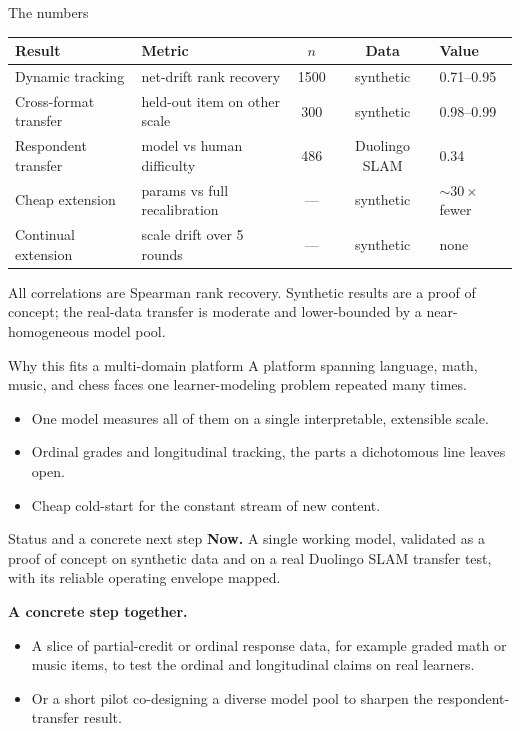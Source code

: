 \documentclass[aspectratio=169]{beamer}
\begin{document}
\begin{frame}{The numbers}
  \centering\small
  \begin{tabular}{llccl}
    \toprule
    Result & Metric & $n$ & Data & Value \\
    \midrule
    Dynamic tracking      & net-drift rank recovery       & 1500 & synthetic       & 0.71--0.95 \\
    Cross-format transfer & held-out item on other scale  & 300  & synthetic       & 0.98--0.99 \\
    Respondent transfer   & model vs human difficulty     & 486  & Duolingo SLAM   & 0.34 \\
    Cheap extension      & params vs full recalibration & ---  & synthetic       & $\sim 30\times$ fewer \\
    Continual extension  & scale drift over 5 rounds   & ---  & synthetic       & none \\
    \bottomrule
  \end{tabular}
  \vspace{0.9em}

  {\footnotesize All correlations are Spearman rank recovery. Synthetic results are a proof of concept; the real-data transfer is moderate and lower-bounded by a near-homogeneous model pool.}
\end{frame}

\begin{frame}{Why this fits a multi-domain platform}
  A platform spanning language, math, music, and chess faces one learner-modeling problem repeated many times.
  \begin{itemize}
    \item One model measures all of them on a single interpretable, extensible scale.
    \item Ordinal grades and longitudinal tracking, the parts a dichotomous line leaves open.
    \item Cheap cold-start for the constant stream of new content.
  \end{itemize}
\end{frame}

\begin{frame}{Status and a concrete next step}
  \textbf{Now.} A single working model, validated as a proof of concept on synthetic data and on a real Duolingo SLAM transfer test, with its reliable operating envelope mapped.
  \vspace{0.6em}

  \textbf{A concrete step together.}
  \begin{itemize}
    \item A slice of partial-credit or ordinal response data, for example graded math or music items, to test the ordinal and longitudinal claims on real learners.
    \item Or a short pilot co-designing a diverse model pool to sharpen the respondent-transfer result.
  \end{itemize}
\end{frame}
\end{document}
